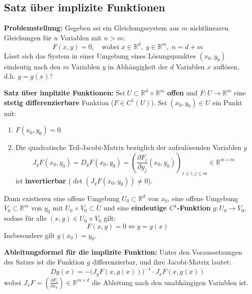 \subsection{Satz über implizite Funktionen}

\begin{definition}
    \textbf{Problemstellung:} Gegeben sei ein Gleichungssystem aus $m$ nichtlinearen Gleichungen für $n$ Variablen mit $n > m$:
    $$ F(x, y) = 0, \quad \text{wobei } x \in \mathbb{R}^d, \; y \in \mathbb{R}^m, \; n = d + m $$
    Lässt sich das System in einer Umgebung eines Lösungspunktes $(x_0, y_0)$ eindeutig nach den $m$ Variablen $y$ in Abhängigkeit der $d$ Variablen $x$ auflösen, d.h. $y = g(x)$?
\end{definition}

\begin{theorem}
    \textbf{Satz über implizite Funktionen:}
    Sei $U \subset \mathbb{R}^d \times \mathbb{R}^m$ \textbf{offen} und $F: U \to \mathbb{R}^m$ eine \textbf{stetig differenzierbare} Funktion ($F \in C^1(U)$). Sei $(x_0, y_0) \in U$ ein Punkt mit:
    \begin{enumerate}
        \item $F(x_0, y_0) = 0$.
        \item Die quadratische Teil-Jacobi-Matrix bezüglich der aufzulösenden Variablen $y$
        $$ J_y F(x_0, y_0) = D_y F(x_0, y_0) = \left( \frac{\partial F_i}{\partial y_j}(x_0, y_0) \right)_{1 \le i, j \le m} \in \mathbb{R}^{m \times m} $$
        ist \textbf{invertierbar} ($\det(J_y F(x_0, y_0)) \neq 0$).
    \end{enumerate}
    Dann existieren eine offene Umgebung $U_0 \subset \mathbb{R}^d$ von $x_0$, eine offene Umgebung $V_0 \subset \mathbb{R}^m$ von $y_0$ mit $U_0 \times V_0 \subset U$ und eine \textbf{eindeutige $C^1$-Funktion} $g: U_0 \to V_0$, sodass für alle $(x, y) \in U_0 \times V_0$ gilt:
    $$ F(x, y) = 0 \iff y = g(x) $$
    Insbesondere gilt $g(x_0) = y_0$.
\end{theorem}

\begin{theorem}
    \textbf{Ableitungsformel für die implizite Funktion:}
    Unter den Voraussetzungen des Satzes ist die Funktion $g$ differenzierbar, und ihre Jacobi-Matrix lautet:
    $$ Dg(x) = - \big( J_y F(x, g(x)) \big)^{-1} \cdot J_x F(x, g(x)) $$
    wobei $J_x F = \left( \frac{\partial F_i}{\partial x_k} \right) \in \mathbb{R}^{m \times d}$ die Ableitung nach den unabhängigen Variablen ist.
\end{theorem}

